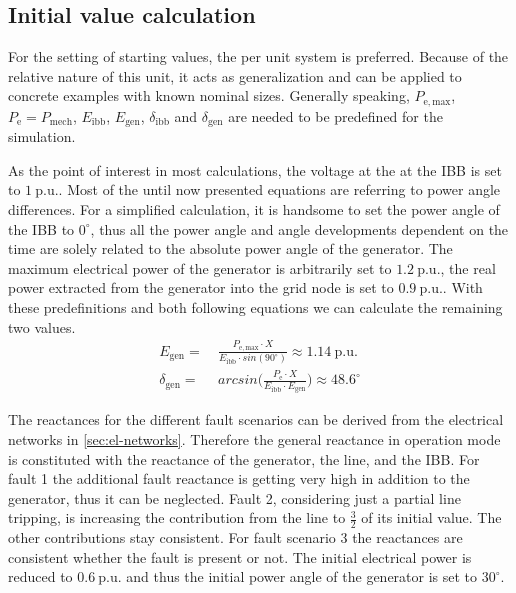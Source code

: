 \subsection{Initial value calculation}
\label{sec:initials}

For the setting of starting values, the per unit system is preferred. Because of the relative nature of this unit, it acts as generalization and can be applied to concrete examples with known nominal sizes. Generally speaking, $P_\mathrm{e,max}$, $P_\mathrm{e}=P_\mathrm{mech}$, $E_\mathrm{ibb}$, $E_\mathrm{gen}$, $\delta_\mathrm{ibb}$ and $\delta_\mathrm{gen}$ are needed to be predefined for the simulation. 

As the point of interest in most calculations, the voltage at the at the \acs{IBB} is set to $1~\mathrm{p.u.}$. Most of the until now presented equations are referring to power angle differences. For a simplified calculation, it is handsome to set the power angle of the \acs{IBB} to $0^\circ$, thus all the power angle and angle developments dependent on the time are solely related to the absolute power angle of the generator. The maximum electrical power of the generator is arbitrarily set to $1.2~\mathrm{p.u.}$, the real power extracted from the generator into the grid node is set to $0.9~\mathrm{p.u.}$. With these predefinitions and both following equations we can calculate the remaining two values. 
\begin{align}
        E_\mathrm{gen}=&~\frac{P_\mathrm{e,max} \cdot X}{E_\mathrm{ibb} \cdot sin(90^\circ)} \approx 1.14~\mathrm{p.u.} \nonumber \\[6pt]
        \delta_\mathrm{gen}=&~arcsin\Bigg(\frac{P_\mathrm{e} \cdot X}{E_\mathrm{ibb} \cdot E_\mathrm{gen}}\Bigg) \approx 48.6^\circ \nonumber
\end{align}

The reactances for the different fault scenarios can be derived from the electrical networks in \autoref{sec:el-networks}. Therefore the general reactance in operation mode is constituted with the reactance of the generator, the line, and the \acs{IBB}. For fault 1 the additional fault reactance is getting very high in addition to the generator, thus it can be neglected. Fault 2, considering just a partial line tripping, is increasing the contribution from the line to $\frac{3}{2}$ of its initial value. The other contributions stay consistent. For fault scenario 3 the reactances are consistent whether the fault is present or not. The initial electrical power is reduced to  $0.6~\mathrm{p.u.}$ and thus the initial power angle of the generator is set to $30^\circ$.

